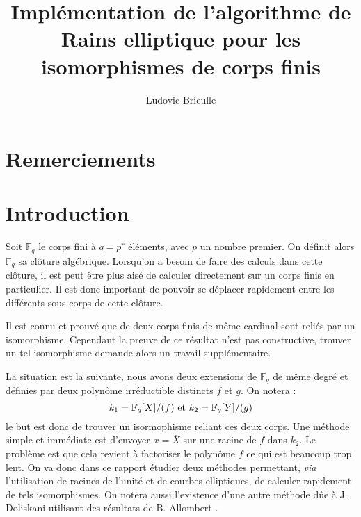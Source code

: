 \documentclass[a4paper]{article} %
\numberwithin{section}{part}
\numberwithin{equation}{section}
\newcommand\GF[1]{\mathbb{F}_{#1}}
\begin{document}
\title{Implémentation de l'algorithme de Rains elliptique pour les isomorphismes
de corps finis}
\author{Ludovic Brieulle}
\newtheorem{thm}{Thèorème}[section]
\newtheorem{lem}[thm]{Lemme}
\newtheorem{cor}{Corollaire}[thm]
\newtheorem{prop}[thm]{Proposition}
\theoremstyle{definition}
\newtheorem{defn}[thm]{Définition}
\newtheorem*{ex}{Exemple}
\theoremstyle{remark}
\newtheorem*{rem}{Remarque}

\maketitle
\part*{Remerciements}

\tableofcontents
\newpage

\part*{Introduction}
Soit $\GF{q}$ le corps fini à $q = p^r$ éléments, avec $p$ un nombre premier. On
définit alors $\overline{\GF{q}}$ sa clôture algébrique. Lorsqu'on a besoin de
faire des calculs dans cette clôture, il est peut être plus aisé de calculer
directement sur un corps finis en particulier. Il est donc important de pouvoir
se déplacer rapidement entre les différents sous-corps de cette clôture.\par
Il est connu et prouvé que de deux corps finis de même cardinal sont reliés par
un isomorphisme. Cependant la preuve de ce résultat n'est pas constructive,
trouver un tel isomorphisme demande alors un travail supplémentaire.\par
La situation est la suivante, nous avons deux extensions de $\GF{q}$ de même
degré et définies par deux polynôme irréductible distincts $f$ et $g$. On notera
:
\[k_1=\GF{q}[X]/(f)\textup{ et }k_2=\GF{q}[Y]/(g)\]
le but est donc de trouver un isormophisme reliant ces deux corps. Une méthode
simple et immédiate est d'envoyer $x = \bar{X}$ sur une racine de $f$ dans
$k_2$. Le problème est que cela revient à factoriser le polynôme $f$ ce qui est
beaucoup trop lent.
On va donc dans ce rapport étudier deux méthodes permettant, \textit{via}
l'utilisation de racines de l'unité et de courbes elliptiques, de calculer
rapidement de tels isomorphismes. On notera aussi l'existence d'une autre
méthode dûe à J. Doliskani \cite{Dol} utilisant des résultats de B. Allombert
\cite{All}.
\end{document}
